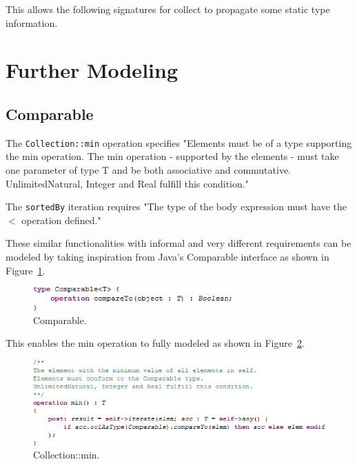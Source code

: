 \documentclass{eceasst}
\begin{document}

This allows the following signatures for collect to propagate some static type information.




\section{Further Modeling}

\subsection{Comparable}

The \verb|Collection::min| operation specifies "Elements must be of a type supporting the min operation. The min operation - supported by the elements - must take one parameter of type T and be both associative and commutative. UnlimitedNatural, Integer and Real fulfill this condition."

The \verb|sortedBy| iteration requires "The type of the body expression must have the $<$ operation defined."

These similar functionalities with informal and very different requirements can be modeled by taking inspiration from Java's Comparable interface as shown in Figure~\ref{fig:Comparable}.

\begin{figure}
  \begin{center}
    \includegraphics[width=3.0in]{Comparable.png}
  \end{center}
  \caption{Comparable.}
  \label{fig:Comparable}
\end{figure}

This enables the min operation to fully modeled as shown in Figure~\ref{fig:Collection_min}.

\begin{figure}
  \begin{center}
    \includegraphics[width=5.0in]{Collection_min.png}
  \end{center}
  \caption{Collection::min.}
  \label{fig:Collection_min}
\end{figure}
\end{document}
